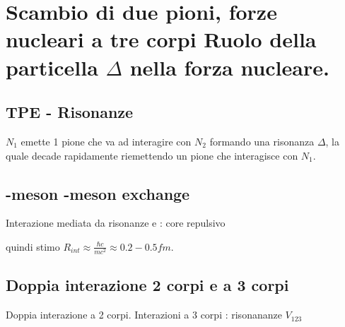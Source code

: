 \documentclass[main.tex]{subfiles}
\begin{document}
\section{Scambio di due pioni, forze nucleari a tre corpi Ruolo della particella $\Delta$ nella forza nucleare.}

\subsection{TPE - Risonanze}

$N_1$ emette 1 pione che va ad interagire con $N_2$ formando una risonanza $\Delta$, la quale decade rapidamente riemettendo un pione che interagisce con $N_1$.


\subsection{\Pgr-meson \Pgo-meson exchange}
Interazione mediata da risonanze \Pgr e \Pgo: core repulsivo

 quindi stimo $R_{int}\approx\frac{\hbar c}{mc^2}\approx 0.2-0.5 fm$.

\subsection{Doppia interazione 2 corpi e a 3 corpi}

Doppia interazione a 2 corpi.
Interazioni a 3 corpi : risonananze $V_{123}$
\end{document}

